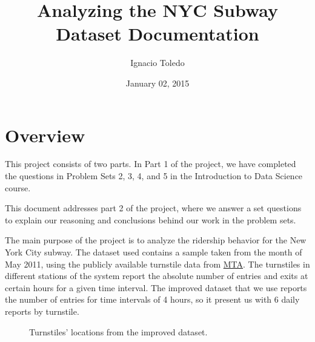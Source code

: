 \documentclass[letterpaper,10pt,english]{sphinxmanual}
\title{Analyzing the NYC Subway Dataset Documentation}
\date{January 02, 2015}
\author{Ignacio Toledo}
\begin{document}
\maketitle
\tableofcontents
{}\label{index::doc}



\chapter{Overview}
\label{overview:overview}\label{overview::doc}\label{overview:welcome-to-analyzing-the-nyc-subway-dataset-s-documentation}
This project consists of two parts. In Part 1 of the project, we have completed
the questions in Problem Sets 2, 3, 4, and 5 in the Introduction to
Data Science course.

This document addresses part 2 of the project, where we answer a set questions
to explain our reasoning and conclusions behind our work in the problem sets.

The main purpose of the project is to analyze the ridership behavior for the
New York City subway. The dataset used contains a sample taken from the month
of May 2011, using the publicly available turnstile data from
\href{http://web.mta.info/developers/turnstile.html}{MTA}. The turnstiles in
different stations of the system report the absolute number of entries and exits
at certain hours for a given time interval. The improved dataset that we use
reports the number of entries for time intervals of 4 hours, so it present us
with 6 daily reports by turnstile.
\begin{figure}[htbp]
\centering
\capstart

\caption{Turnstiles' locations from the improved dataset.}\end{figure}
\end{document}
